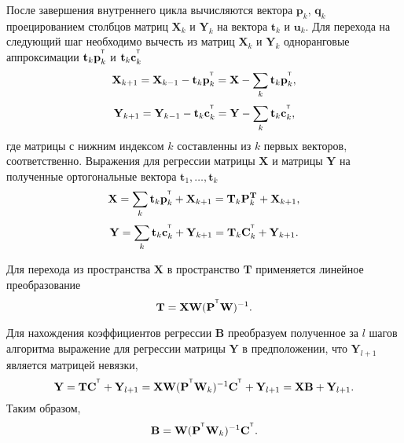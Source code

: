 \documentclass[12pt,twoside]{article}
\newcommand{\bY}{\mathbf{Y}}
\newcommand{\bX}{\mathbf{X}}
\newcommand{\bu}{\mathbf{u}}
\newcommand{\bt}{\mathbf{t}}
\newcommand{\bp}{\mathbf{p}}
\newcommand{\bq}{\mathbf{q}}
\newcommand{\bc}{\mathbf{c}}
\newcommand{\bP}{\mathbf{P}}
\newcommand{\bT}{\mathbf{T}}
\newcommand{\bC}{\mathbf{C}}
\newcommand{\bW}{\mathbf{W}}
\newcommand{\bB}{\mathbf{B}}
\begin{document}
После завершения внутреннего цикла вычисляются вектора $\bp_k$, $\bq_k$ проецированием столбцов матриц $\bX_k$ и $\bY_k$ на вектора $\bt_k$ и $\bu_k$. Для перехода на следующий шаг необходимо вычесть из матриц $\bX_k$ и $\bY_k$ одноранговые аппроксимации $\bt_k \bp_k^{\T}$ и $\bt_k \bc_k^{\T}$
\begin{equation*}
    \bX_{k + 1} = \bX_{k-1} - \bt_k \bp_k^{\T} = \bX - \sum_k \bt_k \bp_k^{\T},
\end{equation*}
\begin{equation*}
    \bY_{k + 1} = \bY_{k-1} - \bt_k \bc_k^{\T} = \bY - \sum_k \bt_k \bc_k^{\T},
\end{equation*}
где матрицы с нижним индексом $k$ составленны из $k$ первых векторов, соответственно.
Выражения для регрессии матрицы $\bX$ и матрицы $\bY$ на полученные ортогональные вектора $\bt_1, \dots, \bt_k$
\begin{equation*}
    \bX = \sum_k \bt_k \bp_k^{\T} + \bX_{k + 1} = \bT_k \bP_k^{\bT} + \bX_{k + 1},
\end{equation*}
\begin{equation*}
    \bY = \sum_k \bt_k \bc_k^{\T} + \bY_{k + 1} = \bT_k \bC_k^{\T} + \bY_{k + 1}.
\end{equation*}

Для перехода из пространства $\bX$ в пространство $\bT$ применяется линейное преобразование
\[
	\bT = \bX \bW (\bP^{\T} \bW)^{-1}.
\]

Для нахождения коэффициентов регрессии $\bB$ преобразуем полученное за $l$ шагов алгоритма выражение для регрессии матрицы $\bY$ в предположении, что $\bY_{l + 1}$ является матрицей невязки, 
\begin{equation*}
    \bY = \bT \bC^{\T} + \bY_{l + 1} = \bX \bW (\bP^{\T} \bW_k)^{-1} \bC^{\T} + \bY_{l + 1} = \bX \bB + \bY_{l + 1}.
\end{equation*}
Таким образом, 
\begin{equation*}
    \bB = \bW (\bP^{\T} \bW_k)^{-1} \bC^{\T}.
\end{equation*}
\end{document}
